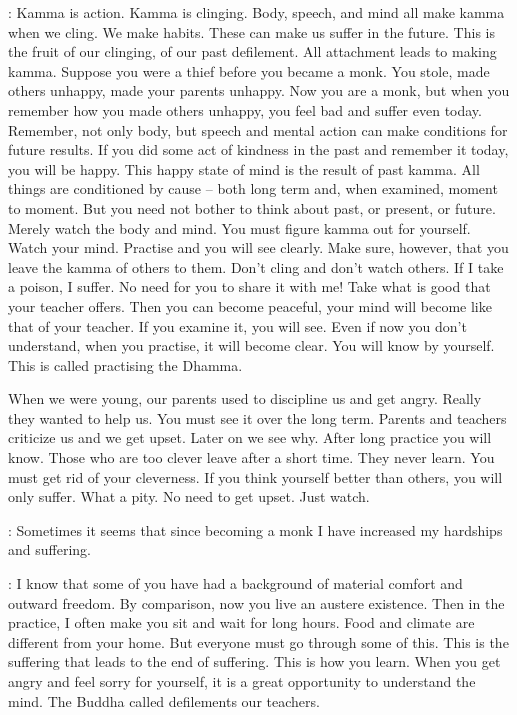 : Kamma is action. Kamma is clinging. Body, speech, and mind all make kamma when we cling. We make habits. These can make us suffer in the future. This is the fruit of our clinging, of our past defilement. All attachment leads to making kamma. Suppose you were a thief before you became a monk. You stole, made others unhappy, made your parents unhappy. Now you are a monk, but when you remember how you made others unhappy, you feel bad and suffer even today. Remember, not only body, but speech and mental action can make conditions for future results. If you did some act of kindness in the past and remember it today, you will be happy. This happy state of mind is the result of past kamma. All things are conditioned by cause -- both long term and, when examined, moment to moment. But you need not bother to think about past, or present, or future. Merely watch the body and mind. You must figure kamma out for yourself. Watch your mind. Practise and you will see clearly. Make sure, however, that you leave the kamma of others to them. Don't cling and don't watch others. If I take a poison, I suffer. No need for you to share it with me! Take what is good that your teacher offers. Then you can become peaceful, your mind will become like that of your teacher. If you examine it, you will see. Even if now you don't understand, when you practise, it will become clear. You will know by yourself. This is called practising the Dhamma. 

When we were young, our parents used to discipline us and get angry. Really they wanted to help us. You must see it over the long term. Parents and teachers criticize us and we get upset. Later on we see why. After long practice you will know. Those who are too clever leave after a short time. They never learn. You must get rid of your cleverness. If you think yourself better than others, you will only suffer. What a pity. No need to get upset. Just watch. 

:
Sometimes it seems that since becoming a monk I have increased my hardships and suffering. 

: I know that some of you have had a background of material comfort and outward freedom. By comparison, now you live an austere existence. Then in the practice, I often make you sit and wait for long hours. Food and climate are different from your home. But everyone must go through some of this. This is the suffering that leads to the end of suffering. This is how you learn. When you get angry and feel sorry for yourself, it is a great opportunity to understand the mind. The Buddha called defilements our teachers. 

